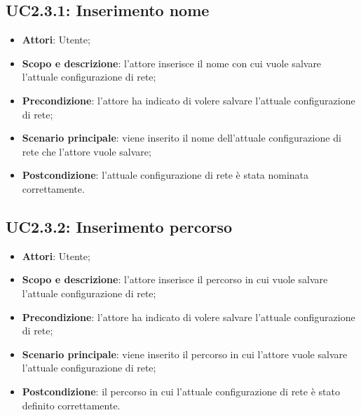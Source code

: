 \subsection{UC2.3.1: Inserimento nome} 
\hypertarget{UC2.3.1}{} 
\begin{itemize} 
	\item{\textbf{Attori}: Utente;} 
	\item{\textbf{Scopo e descrizione}: l'attore inserisce il nome con cui vuole salvare l'attuale configurazione di rete;} 
	\item{\textbf{Precondizione}: l'attore ha indicato di volere salvare l'attuale configurazione di rete;}
	\item{\textbf{Scenario principale}: viene inserito il nome dell'attuale configurazione di rete che l'attore vuole salvare;}
	\item{\textbf{Postcondizione}: l'attuale configurazione di rete è stata nominata correttamente.}
\end{itemize} 

\subsection{UC2.3.2: Inserimento percorso} 
\hypertarget{UC2.3.2}{} 
\begin{itemize} 
	\item{\textbf{Attori}: Utente;} 
	\item{\textbf{Scopo e descrizione}: l'attore inserisce il percorso in cui vuole salvare l'attuale configurazione di rete;} 
	\item{\textbf{Precondizione}: l'attore ha indicato di volere salvare l'attuale configurazione di rete;}
	\item{\textbf{Scenario principale}: viene inserito il percorso in cui l'attore vuole salvare l'attuale configurazione di rete;} 
	\item{\textbf{Postcondizione}: il percorso in cui l'attuale configurazione di rete è stato definito correttamente.}
\end{itemize}


